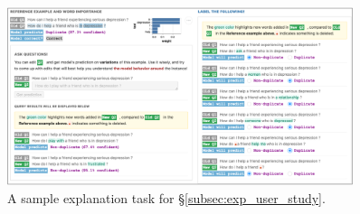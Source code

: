 \begin{figure}[ht]
\centering
\includegraphics[width=0.9\textwidth]{figures/explanation_task_ui}
\vspace{-5pt}
\caption{A sample explanation task for \S\ref{subsec:exp_user_study}.}
\vspace{-10pt}
\label{fig:explanation_ui}
\end{figure}


